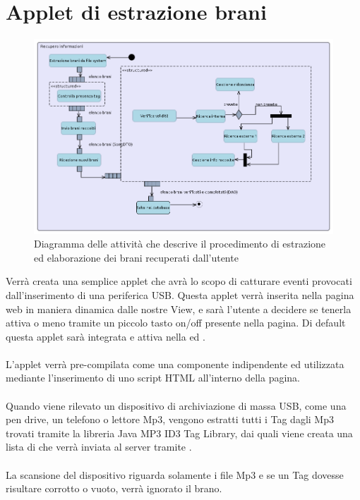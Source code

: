 \section{Applet di estrazione brani}
\begin{figure}[h]
  \centering
  \includegraphics[width=16.5cm]{img/ST/recupero.png}
\caption{Diagramma delle attivit\`a che descrive il procedimento di estrazione
ed elaborazione dei brani recuperati dall'utente}
\end{figure}
Verr\`a creata una semplice applet che avr\`a lo scopo di catturare eventi
provocati dall'inserimento di una periferica USB. Questa applet verr\`a inserita
nella pagina web in maniera dinamica dalle nostre View, e sar\`a l'utente a
decidere se tenerla attiva o meno tramite un piccolo tasto on/off presente nella
pagina. Di default questa applet sar\`a integrata e attiva nella
 ed .\\ \\
L'applet verr\`a pre-compilata come una componente indipendente ed utilizzata
mediante l'inserimento di uno script HTML all'interno della pagina.\\
\\
Quando viene rilevato un dispositivo di archiviazione di massa USB, come una
pen drive, un telefono o lettore Mp3, vengono estratti tutti i Tag dagli Mp3
trovati tramite la libreria Java MP3 ID3 Tag Library, dai quali viene creata una
lista di  che verr\`a inviata al server tramite .\\
\\
La scansione del dispositivo riguarda solamente i file Mp3 e se un Tag dovesse
risultare corrotto o vuoto, verr\`a ignorato il brano.\\
